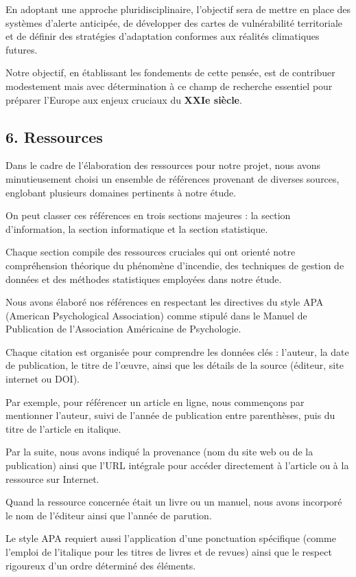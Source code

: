 \documentclass[
]{article}
\begin{document}
En adoptant une approche pluridisciplinaire, l'objectif sera de mettre
en place des systèmes d'alerte anticipée, de développer des cartes de
vulnérabilité territoriale et de définir des stratégies d'adaptation
conformes aux réalités climatiques futures.

Notre objectif, en établissant les fondements de cette pensée, est de
contribuer modestement mais avec détermination à ce champ de recherche
essentiel pour préparer l'Europe aux enjeux cruciaux du \textbf{XXIe
siècle}.

\subsection{6. Ressources}\label{ressources}

Dans le cadre de l'élaboration des ressources pour notre projet, nous
avons minutieusement choisi un ensemble de références provenant de
diverses sources, englobant plusieurs domaines pertinents à notre étude.

On peut classer ces références en trois sections majeures : la section
d'information, la section informatique et la section statistique.

Chaque section compile des ressources cruciales qui ont orienté notre
compréhension théorique du phénomène d'incendie, des techniques de
gestion de données et des méthodes statistiques employées dans notre
étude.

Nous avons élaboré nos références en respectant les directives du style
APA (American Psychological Association) comme stipulé dans le Manuel de
Publication de l'Association Américaine de Psychologie.

Chaque citation est organisée pour comprendre les données clés :
l'auteur, la date de publication, le titre de l'œuvre, ainsi que les
détails de la source (éditeur, site internet ou DOI).

Par exemple, pour référencer un article en ligne, nous commençons par
mentionner l'auteur, suivi de l'année de publication entre parenthèses,
puis du titre de l'article en italique.

Par la suite, nous avons indiqué la provenance (nom du site web ou de la
publication) ainsi que l'URL intégrale pour accéder directement à
l'article ou à la ressource sur Internet.

Quand la ressource concernée était un livre ou un manuel, nous avons
incorporé le nom de l'éditeur ainsi que l'année de parution.

Le style APA requiert aussi l'application d'une ponctuation spécifique
(comme l'emploi de l'italique pour les titres de livres et de revues)
ainsi que le respect rigoureux d'un ordre déterminé des éléments.
\end{document}
